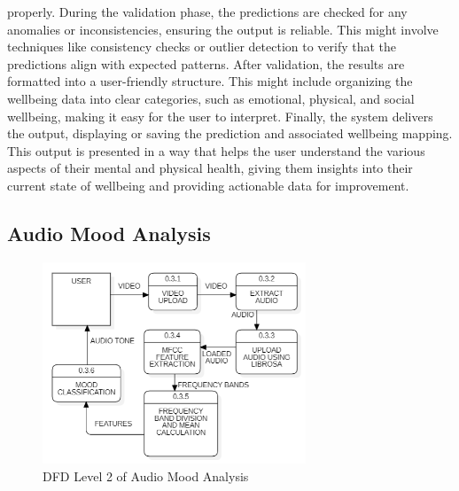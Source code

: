 properly. During the validation phase, the predictions are checked for any anomalies or inconsistencies, ensuring the output is reliable. This might involve techniques like consistency checks or outlier detection to verify that the predictions align with expected patterns. After validation, the results are formatted into a user-friendly structure. This might include organizing the wellbeing data into clear categories, such as emotional, physical, and social wellbeing, making it easy for the user to interpret. Finally, the system delivers the output, displaying or saving the prediction and associated wellbeing mapping. This output is presented in a way that helps the user understand the various aspects of their mental and physical health, giving them insights into their current state of wellbeing and providing actionable data for improvement.


\subsection{Audio Mood Analysis}

\begin{figure}[h!]  
    \centering
    \includegraphics[width=0.7\textwidth]{Images/DFD L2 AM.png}  
    \caption{DFD Level 2 of Audio Mood Analysis}
    \label{dfdl671}  %
\end{figure}

